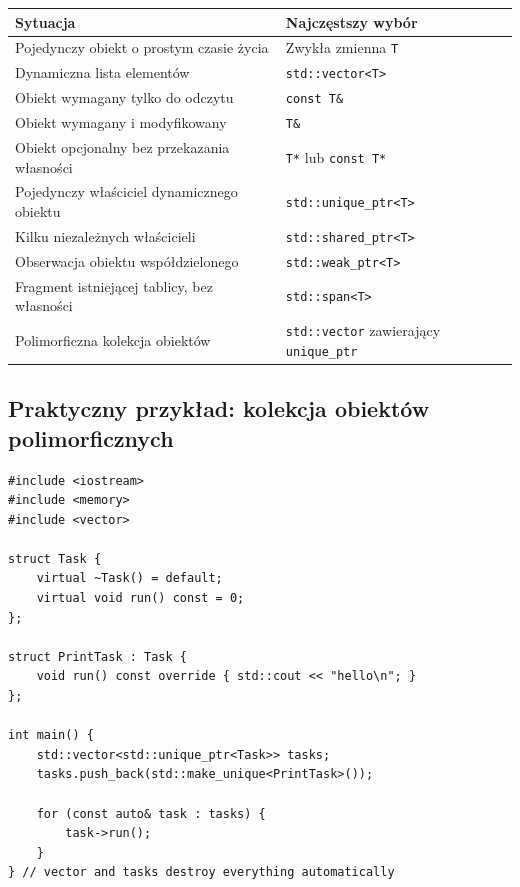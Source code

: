 \begin{center}
\small
\begin{tabular}{|p{}|p{}|}
\hline
\textbf{Sytuacja} & \textbf{Najczęstszy wybór} \\
\hline
Pojedynczy obiekt o prostym czasie życia & Zwykła zmienna \texttt{T} \\
\hline
Dynamiczna lista elementów & \texttt{std::vector<T>} \\
\hline
Obiekt wymagany tylko do odczytu & \texttt{const T\&} \\
\hline
Obiekt wymagany i modyfikowany & \texttt{T\&} \\
\hline
Obiekt opcjonalny bez przekazania własności & \texttt{T*} lub \texttt{const T*} \\
\hline
Pojedynczy właściciel dynamicznego obiektu & \texttt{std::unique\_ptr<T>} \\
\hline
Kilku niezależnych właścicieli & \texttt{std::shared\_ptr<T>} \\
\hline
Obserwacja obiektu współdzielonego & \texttt{std::weak\_ptr<T>} \\
\hline
Fragment istniejącej tablicy, bez własności & \texttt{std::span<T>} \\
\hline
Polimorficzna kolekcja obiektów & \texttt{std::vector} zawierający \texttt{unique\_ptr} \\
\hline
\end{tabular}
\end{center}

\subsection{Praktyczny przykład: kolekcja obiektów polimorficznych}

\begin{lstlisting}
#include <iostream>
#include <memory>
#include <vector>

struct Task {
    virtual ~Task() = default;
    virtual void run() const = 0;
};

struct PrintTask : Task {
    void run() const override { std::cout << "hello\n"; }
};

int main() {
    std::vector<std::unique_ptr<Task>> tasks;
    tasks.push_back(std::make_unique<PrintTask>());

    for (const auto& task : tasks) {
        task->run();
    }
} // vector and tasks destroy everything automatically
\end{lstlisting}

